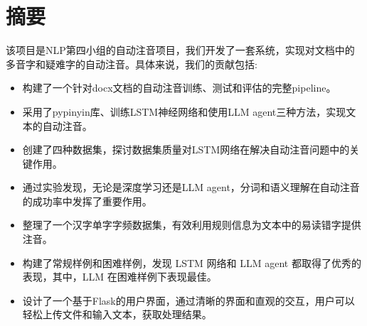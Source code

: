 \documentclass[12pt,hyperref,a4paper,UTF8]{ctexart}
\begin{document}
\cover

%
%

\thispagestyle{empty} %

\newpage
\tableofcontents

\newpage

\section{摘要}
该项目是NLP第四小组的自动注音项目，我们开发了一套系统，实现对文档中的多音字和疑难字的自动注音。具体来说，我们的贡献包括:
\begin{itemize}
    \item 构建了一个针对docx文档的自动注音训练、测试和评估的完整pipeline。
    \item 采用了pypinyin库、训练LSTM神经网络和使用LLM agent三种方法，实现文本的自动注音。
    \item 创建了四种数据集，探讨数据集质量对LSTM网络在解决自动注音问题中的关键作用。
    \item 通过实验发现，无论是深度学习还是LLM agent，分词和语义理解在自动注音的成功率中发挥了重要作用。
    \item 整理了一个汉字单字字频数据集，有效利用规则信息为文本中的易读错字提供注音。
    \item 构建了常规样例和困难样例，发现 LSTM 网络和 LLM agent 都取得了优秀的表现，其中，LLM 在困难样例下表现最佳。
    \item 设计了一个基于Flask的用户界面，通过清晰的界面和直观的交互，用户可以轻松上传文件和输入文本，获取处理结果。
\end{itemize}
\end{document}
